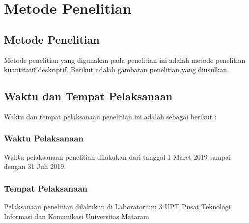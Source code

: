 \documentclass[./skripsi.tex]{subfiles}
\begin{document}
\chapter{Metode Penelitian}
\section{Metode Penelitian}
Metode penelitian yang digunakan pada penelitian ini adalah metode penelitian kuantitatif deskriptif. Berikut adalah gambaran penelitian yang diusulkan.
\begin{center}
\label{svc_loss}
\end{center}
\section{Waktu dan Tempat Pelaksanaan}
\par Waktu dan tempat pelaksanaan penelitian ini adalah sebagai berikut :
\subsection{Waktu Pelaksanaan}

\par Waktu pelaksanaan penelitian dilakukan dari tanggal 1 Maret 2019 sampai dengan 31 Juli 2019.
\subsection{Tempat Pelaksanaan}
\par Pelaksanaan penelitian dilakukan di Laboratorium 3 UPT Pusat Teknologi Informasi dan Komunikasi Universitas Mataram
\end{document}
